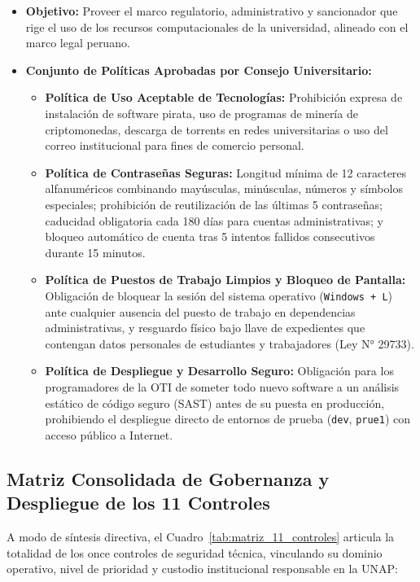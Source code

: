 \begin{itemize}
    \item \textbf{Objetivo:} Proveer el marco regulatorio, administrativo y sancionador que rige el uso de los recursos computacionales de la universidad, alineado con el marco legal peruano.
    \item \textbf{Conjunto de Políticas Aprobadas por Consejo Universitario:}
    \begin{itemize}
        \item \textbf{Política de Uso Aceptable de Tecnologías:} Prohibición expresa de instalación de software pirata, uso de programas de minería de criptomonedas, descarga de torrents en redes universitarias o uso del correo institucional para fines de comercio personal.
        \item \textbf{Política de Contraseñas Seguras:} Longitud mínima de 12 caracteres alfanuméricos combinando mayúsculas, minúsculas, números y símbolos especiales; prohibición de reutilización de las últimas 5 contraseñas; caducidad obligatoria cada 180 días para cuentas administrativas; y bloqueo automático de cuenta tras 5 intentos fallidos consecutivos durante 15 minutos.
        \item \textbf{Política de Puestos de Trabajo Limpios y Bloqueo de Pantalla:} Obligación de bloquear la sesión del sistema operativo (\texttt{Windows + L}) ante cualquier ausencia del puesto de trabajo en dependencias administrativas, y resguardo físico bajo llave de expedientes que contengan datos personales de estudiantes y trabajadores (Ley N° 29733).
        \item \textbf{Política de Despliegue y Desarrollo Seguro:} Obligación para los programadores de la OTI de someter todo nuevo software a un análisis estático de código seguro (SAST) antes de su puesta en producción, prohibiendo el despliegue directo de entornos de prueba (\texttt{dev}, \texttt{prue1}) con acceso público a Internet.
    \end{itemize}
\end{itemize}

\vspace{0.3cm}
\subsection{Matriz Consolidada de Gobernanza y Despliegue de los 11 Controles}

A modo de síntesis directiva, el Cuadro~\ref{tab:matriz_11_controles} articula la totalidad de los once controles de seguridad técnica, vinculando su dominio operativo, nivel de prioridad y custodio institucional responsable en la UNAP:

